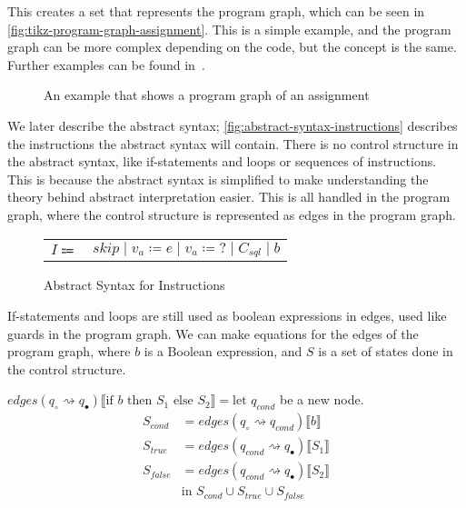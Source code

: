 This creates a set that represents the program graph, which can be seen in \autoref{fig:tikz-program-graph-assignment}.
This is a simple example, and the program graph can be more complex depending on the code, but the concept is the same.
Further examples can be found in~\cite[Figure 2.6]{nielson_formal_2019}.

\begin{figure}[htb!]
    \center
    
    \caption{An example that shows a program graph of an assignment}
    \label{fig:tikz-program-graph-assignment}
\end{figure}

We later describe the abstract syntax; \autoref{fig:abstract-syntax-instructions} describes the instructions the abstract syntax will contain.
There is no control structure in the abstract syntax, like if-statements and loops or sequences of instructions.
This is because the abstract syntax is simplified to make understanding the theory behind abstract interpretation easier.
This is all handled in the program graph, where the control structure is represented as edges in the program graph.

\begin{figure}
    \center
    \begin{tabular}{r l}
        $I \Coloneqq$ & $skip \mid v_a \coloneqq e \mid v_a \coloneqq ? \mid C_{sql} \mid b$
    \end{tabular}
    \caption{Abstract Syntax for Instructions}
    \label{fig:abstract-syntax-instructions}
\end{figure}

If-statements and loops are still used as boolean expressions in edges, used like guards in the program graph.
We can make equations for the edges of the program graph, where $b$ is a Boolean expression, and $S$ is a set of states done in the control structure.

$edges(q_{\circ} \rightsquigarrow q_{\bullet})\llbracket \text{if } b \text{ then } S_1 \text{ else } S_2 \rrbracket = \text{let } q_{cond}$ be a new node.
\begin{align}
S_{cond} &= edges(q_\circ \rightsquigarrow q_{cond})\llbracket b \rrbracket \\
S_{true} &= edges(q_{cond} \rightsquigarrow q_{\bullet})\llbracket S_1 \rrbracket \\
    S_{false} &= edges(q_{cond} \rightsquigarrow q_{\bullet})\llbracket S_2 \rrbracket \\
    &\text{in } S_{cond} \cup S_{true} \cup S_{false}
\end{align}

